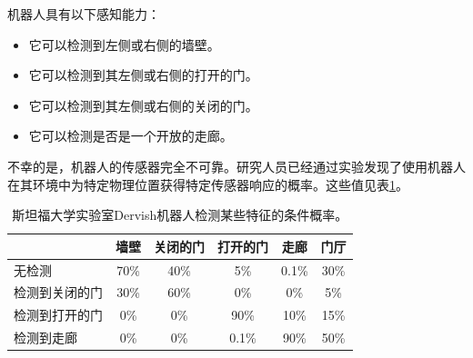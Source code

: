 
机器人具有以下感知能力：

\begin{itemize}

\item 它可以检测到左侧或右侧的墙壁。
\item 它可以检测到其左侧或右侧的打开的门。
\item 它可以检测到其左侧或右侧的关闭的门。
\item 它可以检测是否是一个开放的走廊。
\end{itemize}


不幸的是，机器人的传感器完全不可靠。研究人员已经通过实验发现了使用机器人在其环境中为特定物理位置获得特定传感器响应的概率。这些值见表\ref{tab:dervish_example}。

\begin{table}
\footnotesize
\begin{tabular}{lccccc}
 	& 墙壁	& 关闭的门 & 打开的门	& 走廊 & 门厅\\
\hline
无检测	& 70\%	& 40\%&	5\%	& 0.1\% & 30\%\\
检测到关闭的门 & 30\% &	60\%& 0\% &0\%	& 5\%\\
检测到打开的门 & 0\%	& 0\%&	90\% & 10\% & 15\%\\
检测到走廊 & 0\% &	 0\%&	0.1\% & 90\% &50\%\\
\hline
\end{tabular}
\normalsize
\caption{斯坦福大学实验室Dervish机器人检测某些特征的条件概率。
\label{tab:dervish_example}}
\end{table}


